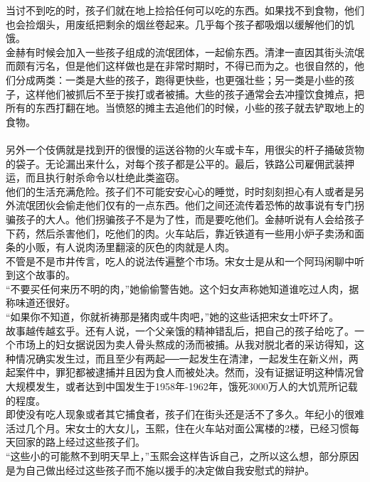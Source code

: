 当讨不到吃的时，孩子们就在地上捡拾任何可以吃的东西。如果找不到食物，他们也会捡烟头，用废纸把剩余的烟丝卷起来。几乎每个孩子都吸烟以缓解他们的饥饿。\\

金赫有时候会加入一些孩子组成的流氓团体，一起偷东西。清津一直因其街头流氓而颇有污名，但是他们这样做也是在非常时期时，不得已而为之。也很自然的，他们分成两类：一类是大些的孩子，跑得更快些，也更强壮些；另一类是小些的孩子，这样他们被抓后不至于挨打或者被捕。大些的孩子通常会去冲撞饮食摊点，把所有的东西打翻在地。当愤怒的摊主去追他们的时候，小些的孩子就去铲取地上的食物。\\
\\

另外一个伎俩就是找到开的很慢的运送谷物的火车或卡车，用很尖的杆子捅破货物的袋子。无论漏出来什么，对每个孩子都是公平的。最后，铁路公司雇佣武装押运，而且执行射杀命令以杜绝此类盗窃。\\

他们的生活充满危险。孩子们不可能安安心心的睡觉，时时刻刻担心有人或者是另外流氓团伙会偷走他们仅有的一点东西。他们之间还流传着恐怖的故事说有专门拐骗孩子的大人。他们拐骗孩子不是为了性，而是要吃他们。金赫听说有人会给孩子下药，然后杀害他们，吃他们的肉。火车站后，靠近铁道有一些用小炉子卖汤和面条的小贩，有人说肉汤里翻滚的灰色的肉就是人肉。\\

不管是不是市井传言，吃人的说法传遍整个市场。宋女士是从和一个阿玛闲聊中听到这个故事的。\\

“不要买任何来历不明的肉，”她偷偷警告她。这个妇女声称她知道谁吃过人肉，据称味道还很好。\\

“如果你不知道，你就祈祷那是猪肉或牛肉吧，”她的这些话把宋女士吓坏了。\\

故事越传越玄乎。还有人说，一个父亲饿的精神错乱后，把自己的孩子给吃了。一个市场上的妇女据说因为卖人骨头熬成的汤而被捕。从我对脱北者的采访得知，这种情况确实发生过，而且至少有两起──一起发生在清津，一起发生在新义州，两起案件中，罪犯都被逮捕并且因为食人而被处决。然而，没有证据证明这种情况曾大规模发生，或者达到中国发生于1958年-1962年，饿死3000万人的大饥荒所记载的程度。\\

即使没有吃人现象或者其它捕食者，孩子们在街头还是活不了多久。年纪小的很难活过几个月。宋女士的大女儿，玉熙，住在火车站对面公寓楼的2楼，已经习惯每天回家的路上经过这些孩子们。\\

“这些小的可能熬不到明天早上，”玉熙会这样告诉自己，之所以这么想，部分原因是为自己做出经过这些孩子而不施以援手的决定做自我安慰式的辩护。\\

